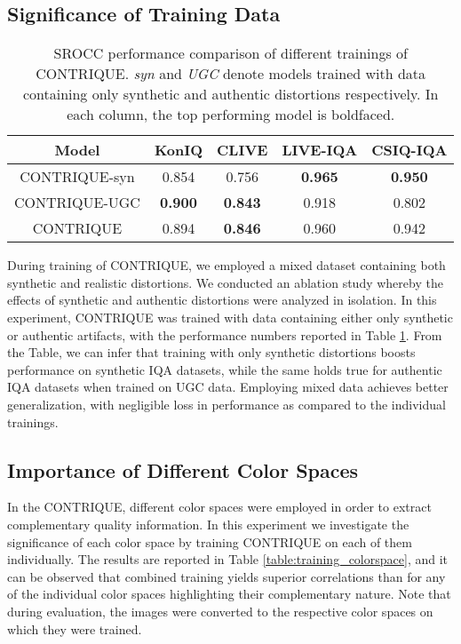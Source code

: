 \documentclass[journal]{IEEEtran}
\begin{document}
\subsection{Significance of Training Data}
\begin{table}[t]
    \caption{SROCC performance comparison of different trainings of CONTRIQUE. \textit{syn} and \textit{UGC} denote models trained with data containing only synthetic and authentic distortions respectively. In each column, the top performing model is boldfaced.}
    \label{table:training_data}
    \centering
    \footnotesize
        \begin{tabular}{|c||c|c|c|c|}
        \hline
        Model & KonIQ & CLIVE & LIVE-IQA & CSIQ-IQA \\ \hline \hline
        CONTRIQUE-syn & 0.854 & 0.756 & \textbf{0.965} & \textbf{0.950} \\ 
        CONTRIQUE-UGC & \textbf{0.900} & \textbf{0.843} & 0.918 & 0.802 \\ \hline
        CONTRIQUE & 0.894 & \textbf{0.846} & 0.960 & 0.942 \\
        \hline
    \end{tabular}
\end{table}

During training of CONTRIQUE, we employed a mixed dataset containing both synthetic and realistic distortions. We conducted an ablation study whereby the effects of synthetic and authentic distortions were analyzed in isolation. In this experiment, CONTRIQUE was trained with data containing either only synthetic or authentic artifacts, with the performance numbers reported in Table \ref{table:training_data}. From the Table, we can infer that training with only synthetic distortions boosts performance on synthetic IQA datasets, while the same holds true for authentic IQA datasets when trained on UGC data. Employing mixed data achieves better generalization, with negligible loss in performance as compared to the individual trainings.

\subsection{Importance of Different Color Spaces}
\label{sec:results_colorspace}
In the CONTRIQUE, different color spaces were employed in order to extract complementary quality information. In this experiment we investigate the significance of each color space by training CONTRIQUE on each of them individually. The results are reported in Table \ref{table:training_colorspace}, and it can be observed that combined training yields superior correlations than for any of the individual color spaces highlighting their complementary nature. Note that during evaluation, the images were converted to the respective color spaces on which they were trained.
\end{document}
